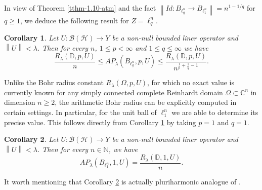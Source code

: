 \documentclass[a4paper,11pt, reqno]{amsart}
\newtheorem{cor}{Corollary}[section]
\theoremstyle{definition}
\newcounter {own}
\newcommand{\norm}[1]{\left\lVert#1\right\rVert}
\begin{document}
In view of Theorem \ref{tthm-1.10-atm} and the fact $\norm{Id: B_{\ell^n_q}\rightarrow B_{\ell^n_1}} =n^{1-1/q}$ for $q \geq 1$, we deduce the following result for $Z=\ell^n_q$.
\begin{cor} \label{cor-1.5}
Let $U:\mathcal{B}(\mathcal{H})\rightarrow Y$ be a non-null bounded liner operator and $\norm{U} < \lambda$. Then for every $n$, $1\leq p<\infty$ and $1 \leq q \leq \infty$ we have 
\begin{equation*}
	\frac{R_\lambda(\mathbb{D},p,U)}{n}\leq AP_\lambda(B_{\ell^n_q},p, U)\leq  \frac{R_\lambda(\mathbb{D},p,U)}{n^{\frac{1}{p}+\frac{1}{q}-1}}.
\end{equation*}
\end{cor}
Unlike the Bohr radius constant $R_\lambda(\Omega,p, U)$, for which no exact value is currently known for any simply connected complete Reinhardt domain $\Omega \subset \mathbb{C}^n$ in dimension $n \geq 2$, the arithmetic Bohr radius can be explicitly computed in certain settings. In particular, for the unit ball of $\ell^n_1$ we are able to determine its precise value. This follows directly from Corollary \ref{cor-1.5} by taking $p=1$ and $q=1$.
\begin{cor} \label{cor-1.8}
Let $U:\mathcal{B}(\mathcal{H})\rightarrow Y$ be a non-null bounded liner operator and $\norm{U} < \lambda$.	Then for every $n\in \mathbb{N}$, we have 
	\begin{equation*}
		AP_\lambda(B_{\ell^n_1},1, U)=\frac{R_\lambda(\mathbb{D},1,U)}{n}.
	\end{equation*}
\end{cor}
It worth mentioning that Corollary \ref{cor-1.8} is actually pluriharmonic analogue of \cite[Theorem 3.1]{defant-2008}.
\vspace{1mm}
\end{document}

